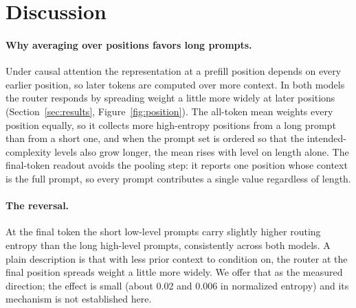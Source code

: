 \documentclass[10pt,twocolumn]{article}
\begin{document}
\section{Discussion}
\label{sec:discussion}

\paragraph{Why averaging over positions favors long prompts.}
Under causal attention the representation at a prefill position depends on
every earlier position, so later tokens are computed over more context. In
both models the router responds by spreading weight a little more widely at
later positions (Section~\ref{sec:results}, Figure~\ref{fig:position}). The
all-token mean weights every position equally, so it collects more
high-entropy positions from a long prompt than from a short one, and when
the prompt set is ordered so that the intended-complexity levels also grow
longer, the mean rises with level on length alone. The final-token readout
avoids the pooling step: it reports one position whose context is the full
prompt, so every prompt contributes a single value regardless of length.

\paragraph{The reversal.}
At the final token the short low-level prompts carry slightly higher
routing entropy than the long high-level prompts, consistently across both
models. A plain description is that with less prior context to condition on,
the router at the final position spreads weight a little more widely. We
offer that as the measured direction; the effect is small (about 0.02 and
0.006 in normalized entropy) and its mechanism is not established here.
\end{document}
